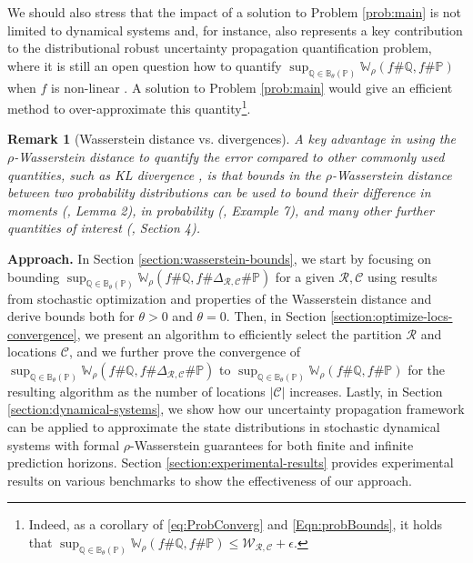 \documentclass[11pt, a4paper, oneside,reqno]{amsart}
\theoremstyle{plain}
\newtheorem{remark}{Remark}
\def\prob{\mathbb{P}}
\def\probQ{\mathbb{Q}}
\def\wasserstein{{\mathbb{W}}}
\def\boundProbDef{{\mathcal{W}_{\bm{\mathcal{R}}, \bm{\mathcal{C}}}}}
\def\bsR{{\bm{\mathcal{R}}}}
\def\bsC{{\bm{\mathcal{C}}}}
\begin{document}
We should also stress that the impact of a solution to Problem \ref{prob:main} is not limited to dynamical systems and, for instance, also represents a key contribution to the distributional robust uncertainty propagation quantification problem, where it is still an open question how to quantify $\sup_{\probQ \in \mathbb{B}_\theta(\prob)} \wasserstein_{\rho}(f \# \probQ, f \# \prob)$ when $f$ is non-linear
\cite{aolaritei2022distributional}. A solution to Problem \ref{prob:main} would give an efficient method to over-approximate this quantity\footnote{Indeed, as a corollary of \eqref{eq:ProbConverg} and \eqref{Eqn:probBounds}, it holds that \(\sup_{\probQ \in \mathbb{B}_\theta(\prob)} \wasserstein_{\rho}(f \# \probQ, f  \# \prob) \leq \boundProbDef + \epsilon\).}.

\begin{remark}[Wasserstein distance vs. divergences]
    A key advantage in using the $\rho$-Wasserstein distance to quantify the error compared to other commonly used quantities, such as KL divergence \cite{gibbs2002choosing}, is that bounds in the  $\rho$-Wasserstein distance between two probability distributions can be used to bound their difference in moments (\cite{adams2024finite}, Lemma 2), in probability (\cite{gao2023distributionally}, Example 7), and many other further quantities of interest (\cite{ernst2022wasserstein}, Section 4). 
\end{remark}



\textbf{Approach.}
In Section \ref{section:wasserstein-bounds}, we start by focusing on bounding $\sup_{\probQ \in \mathbb{B}_\theta(\prob)} \wasserstein_{\rho}(f \# \probQ, f \# \Delta_{\bsR, \bsC} \# \prob)$ for a given ${\bsR, \bsC}$ using results from stochastic optimization and properties of the Wasserstein distance and derive bounds both for $\theta>0$ and $\theta=0$. Then, in Section \ref{section:optimize-locs-convergence}, we present an algorithm to efficiently select the partition $\bsR$ and locations $\bsC$, and we further prove the convergence of $\sup_{\probQ \in \mathbb{B}_\theta(\prob)} \wasserstein_{\rho}(f \# \probQ, f \# \Delta_{\bsR, \bsC} \# \prob)$ to  $\sup_{\probQ \in \mathbb{B}_\theta(\prob)} \wasserstein_{\rho}(f \# \probQ, f \# \prob)$ for the resulting algorithm as the number of locations $|\bsC|$ increases. Lastly, in Section \ref{section:dynamical-systems}, we show how our uncertainty propagation framework can be applied to approximate the state distributions in stochastic dynamical systems with formal $\rho$-Wasserstein guarantees for both finite and infinite prediction horizons. Section \ref{section:experimental-results} provides experimental results on various benchmarks to show the effectiveness of our approach. 
\end{document}
